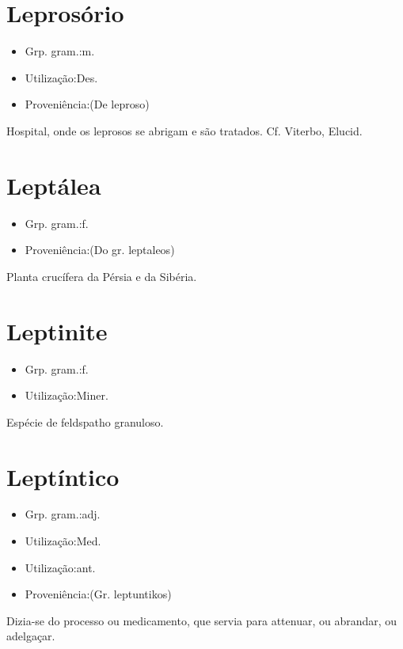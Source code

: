 \section{Leprosório}
\begin{itemize}
\item {Grp. gram.:m.}
\end{itemize}
\begin{itemize}
\item {Utilização:Des.}
\end{itemize}
\begin{itemize}
\item {Proveniência:(De \textunderscore leproso\textunderscore )}
\end{itemize}
Hospital, onde os leprosos se abrigam e são tratados. Cf. Viterbo, \textunderscore Elucid.\textunderscore 
\section{Leptálea}
\begin{itemize}
\item {Grp. gram.:f.}
\end{itemize}
\begin{itemize}
\item {Proveniência:(Do gr. \textunderscore leptaleos\textunderscore )}
\end{itemize}
Planta crucífera da Pérsia e da Sibéria.
\section{Leptinite}
\begin{itemize}
\item {Grp. gram.:f.}
\end{itemize}
\begin{itemize}
\item {Utilização:Miner.}
\end{itemize}
Espécie de feldspatho granuloso.
\section{Leptíntico}
\begin{itemize}
\item {Grp. gram.:adj.}
\end{itemize}
\begin{itemize}
\item {Utilização:Med.}
\end{itemize}
\begin{itemize}
\item {Utilização:ant.}
\end{itemize}
\begin{itemize}
\item {Proveniência:(Gr. \textunderscore leptuntikos\textunderscore )}
\end{itemize}
Dizia-se do processo ou medicamento, que servia para attenuar, ou abrandar, ou adelgaçar.
